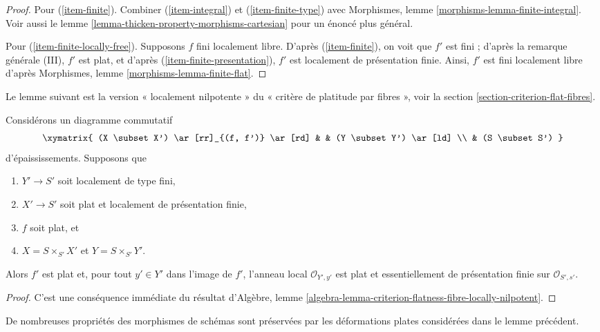 \begin{proof}
\medskip\noindent
Pour (\ref{item-finite}). Combiner (\ref{item-integral})
et (\ref{item-finite-type}) avec
Morphismes, lemme \ref{morphisms-lemma-finite-integral}. Voir aussi
le lemme \ref{lemma-thicken-property-morphisms-cartesian}
pour un énoncé plus général.

\medskip\noindent
Pour (\ref{item-finite-locally-free}). Supposons $f$ fini localement libre. D'après
(\ref{item-finite}), on voit que $f'$ est fini ; d'après la remarque générale (III),
$f'$ est plat, et d'après (\ref{item-finite-presentation}), $f'$ est localement de
présentation finie. Ainsi, $f'$ est fini localement libre d'après
Morphismes, lemme \ref{morphisms-lemma-finite-flat}.
\end{proof}


\noindent
Le lemme suivant est la version « localement nilpotente » du
« critère de platitude par fibres », voir
la section \ref{section-criterion-flat-fibres}.

\begin{lemma}
\label{lemma-flatness-morphism-thickenings-fp-over-ft}
Considérons un diagramme commutatif
$$
\xymatrix{
(X \subset X') \ar[rr]_{(f, f')} \ar[rd] & & (Y \subset Y') \ar[ld] \\
& (S \subset S')
}
$$
d'épaississements. Supposons que
\begin{enumerate}
\item $Y' \to S'$ soit localement de type fini,
\item $X' \to S'$ soit plat et localement de présentation finie,
\item $f$ soit plat, et
\item $X = S \times_{S'} X'$ et $Y = S \times_{S'} Y'$.
\end{enumerate}
Alors $f'$ est plat et, pour tout $y' \in Y'$ dans l'image de $f'$,
l'anneau local $\mathcal{O}_{Y', y'}$ est
plat et essentiellement de présentation finie sur $\mathcal{O}_{S', s'}$.
\end{lemma}

\begin{proof}
C'est une conséquence immédiate du résultat d'Algèbre,
lemme \ref{algebra-lemma-criterion-flatness-fibre-locally-nilpotent}.
\end{proof}

\noindent
De nombreuses propriétés des morphismes de schémas sont préservées par les déformations
plates considérées dans le lemme précédent.

